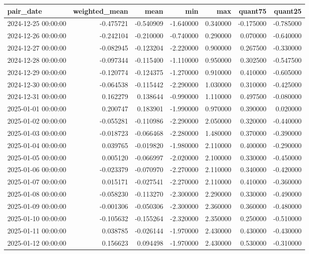 \begin{tabular}{lrrrrrr}
\toprule
pair_date & weighted_mean & mean & min & max & quant75 & quant25 \\
\midrule
2024-12-25 00:00:00 & -0.475721 & -0.540909 & -1.640000 & 0.340000 & -0.175000 & -0.785000 \\
2024-12-26 00:00:00 & -0.242104 & -0.210000 & -0.740000 & 0.290000 & 0.070000 & -0.640000 \\
2024-12-27 00:00:00 & -0.082945 & -0.123204 & -2.220000 & 0.900000 & 0.267500 & -0.330000 \\
2024-12-28 00:00:00 & -0.097344 & -0.115400 & -1.110000 & 0.950000 & 0.302500 & -0.547500 \\
2024-12-29 00:00:00 & -0.120774 & -0.124375 & -1.270000 & 0.910000 & 0.410000 & -0.605000 \\
2024-12-30 00:00:00 & -0.064538 & -0.115442 & -2.290000 & 1.030000 & 0.310000 & -0.425000 \\
2024-12-31 00:00:00 & 0.162279 & 0.138644 & -0.990000 & 1.110000 & 0.497500 & -0.080000 \\
2025-01-01 00:00:00 & 0.200747 & 0.183901 & -1.990000 & 0.970000 & 0.390000 & 0.020000 \\
2025-01-02 00:00:00 & -0.055281 & -0.110986 & -2.290000 & 2.050000 & 0.320000 & -0.440000 \\
2025-01-03 00:00:00 & -0.018723 & -0.066468 & -2.280000 & 1.480000 & 0.370000 & -0.390000 \\
2025-01-04 00:00:00 & 0.039765 & -0.019820 & -1.980000 & 2.110000 & 0.400000 & -0.290000 \\
2025-01-05 00:00:00 & 0.005120 & -0.066997 & -2.020000 & 2.100000 & 0.330000 & -0.450000 \\
2025-01-06 00:00:00 & -0.023379 & -0.070970 & -2.270000 & 2.110000 & 0.340000 & -0.420000 \\
2025-01-07 00:00:00 & 0.015171 & -0.027541 & -2.270000 & 2.110000 & 0.410000 & -0.360000 \\
2025-01-08 00:00:00 & -0.058230 & -0.113270 & -2.300000 & 2.290000 & 0.330000 & -0.490000 \\
2025-01-09 00:00:00 & -0.001306 & -0.050306 & -2.300000 & 2.360000 & 0.360000 & -0.480000 \\
2025-01-10 00:00:00 & -0.105632 & -0.155264 & -2.320000 & 2.350000 & 0.250000 & -0.510000 \\
2025-01-11 00:00:00 & 0.038785 & -0.026144 & -1.970000 & 2.430000 & 0.430000 & -0.430000 \\
2025-01-12 00:00:00 & 0.156623 & 0.094498 & -1.970000 & 2.430000 & 0.530000 & -0.310000 \\

\end{tabular}
